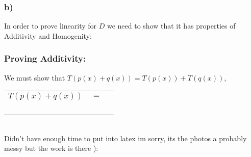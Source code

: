 \documentclass{article}
\begin{document}
\subsubsection*{b)}
In order to prove linearity for $D$ we need to show that it has properties of Additivity and Homogenity:
\subsubsection*{Proving Additivity:}
We must show that $T(p(x)+q(x))=T(p(x))+T(q(x))$, 
\begin{table}[htp]
\centering
\begin{tabular}{ccc}
  $T(p(x)+q(x))$ & $=$  &   \\
   &   &   \\
   &   &   \\
   &   &   \\
   &   &   \\
\end{tabular}
\end{table}\\

Didn't have enough time to put into latex im sorry, its the photos a probably messy but the work is there ):
\end{document}
